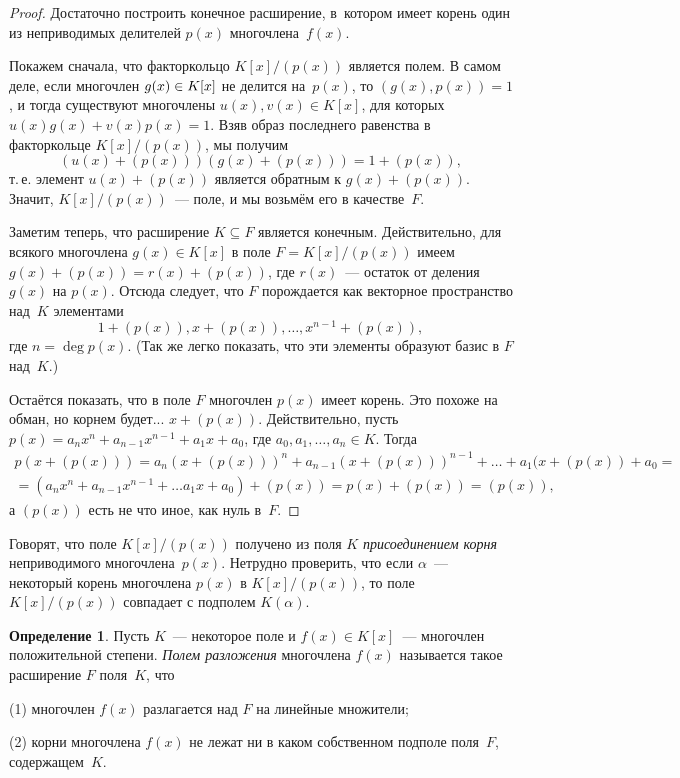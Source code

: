 \documentclass[a4paper, 12pt]{article}
\theoremstyle{definition}
\newtheorem{definition}{Определение}
\theoremstyle{remark}
\begin{document}
\begin{proof}
Достаточно построить конечное расширение, в~котором имеет корень
один из неприводимых делителей $p(x)$ многочлена~$f(x)$.

Покажем сначала, что факторкольцо $K[x]/(p(x))$ является полем. В
самом деле, если многочлен $g(x) \in\nobreak K[x]$ не делится
на~$p(x)$, то $(g(x), p(x)) = 1$, и тогда существуют многочлены
$u(x), v(x) \in K[x]$, для которых $u(x) g(x) + v(x) p(x) = 1$. Взяв
образ последнего равенства в факторкольце $K[x] / (p(x))$, мы
получим
$$(u(x) + (p(x))) (g(x) + (p(x))) = 1 + (p(x)),$$ т.\,е. элемент
$u(x)+(p(x))$ является обратным к $g(x)+(p(x))$. Значит, $K[x] /
(p(x))$~--- поле, и мы возьмём его в качестве~$F$.

Заметим теперь, что расширение $K \subseteq F$ является конечным.
Действительно, для всякого многочлена $g(x) \in K[x]$ в поле $F =
K[x]/(p(x))$ имеем $g(x) + (p(x)) = r(x) + (p(x))$, где $r(x)$~---
остаток от деления $g(x)$ на $p(x)$. Отсюда следует, что $F$
порождается как векторное пространство над~$K$ элементами
$$
1 + (p(x)), x + (p(x)), \ldots, x^{n-1} + (p(x)),
$$
где $n = \deg p(x)$. (Так же легко показать, что эти элементы
образуют базис в $F$ над~$K$.)

Остаётся показать, что в поле $F$ многочлен $p(x)$ имеет корень. Это
похоже на обман, но корнем будет... $x + (p(x))$. Действительно,
пусть $p(x) = a_n x^n + a_{n-1} x^{n-1} + a_1x + a_0$, где $a_0,
a_1, \ldots, a_n \in K$. Тогда
\begin{multline*}
p(x + (p(x))) = a_n(x + (p(x)))^n + a_{n-1} (x + (p(x)))^{n-1} +
\ldots + a_1 (x + (p(x)) + a_0 =\\
= (a_nx^n + a_{n-1}x^{n-1} + \ldots a_1 x + a_0) + (p(x)) = p(x) +
(p(x)) = (p(x)),
\end{multline*}
а $(p(x))$ есть не что иное, как нуль в~$F$.
\end{proof}

Говорят, что поле $K[x] / (p(x))$ получено из поля $K$ {\it
присоединением корня} неприводимого многочлена~$p(x)$. Нетрудно
проверить, что если $\alpha$~--- некоторый корень многочлена $p(x)$
в $K[x]/(p(x))$, то поле $K[x]/(p(x))$ совпадает с подполем
$K(\alpha)$.

\begin{definition}
Пусть $K$~--- некоторое поле и $f(x)\in K[x]$~--- многочлен
положительной степени. {\it Полем разложения} многочлена $f(x)$
называется такое расширение $F$ поля~$K$, что

(1) многочлен $f(x)$ разлагается над $F$ на линейные множители;

(2) корни многочлена $f(x)$ не лежат ни в каком собственном подполе
поля~$F$, содержащем~$K$.
\end{definition}
\end{document}
